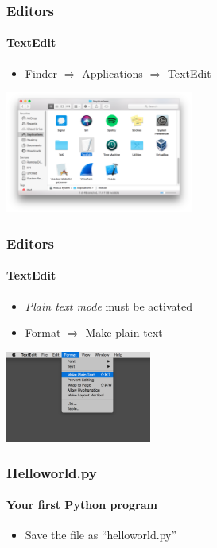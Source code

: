 \documentclass{beamer}
\begin{document}
    \begin{frame}
	    \frametitle{Editors}
	    \framesubtitle{TextEdit}

	    \begin{itemize}
		    \item Finder $\Rightarrow$ Applications $\Rightarrow$ TextEdit
	    \end{itemize}
	    \begin{center}
	    \includegraphics[height=4cm]{images/TextEdit-icon.png}
	    \end{center}
    \end{frame}


    \begin{frame}
	    \frametitle{Editors}
	    \framesubtitle{TextEdit}

	    \begin{itemize}
		    \item \textit{Plain text mode} must be activated
		    \item Format $\Rightarrow$ Make plain text
	    \end{itemize}
	    \begin{center}
	    \includegraphics[height=3cm]{images/make-plain-text.png}
	    \end{center}
    \end{frame}



    \begin{frame}
	    \frametitle{Helloworld.py}
	    \framesubtitle{Your first Python program}
	    \lstD
	    \begin{itemize}
		    \item Save the file as ``helloworld.py''
	    \end{itemize}
    \end{frame}
\end{document}
